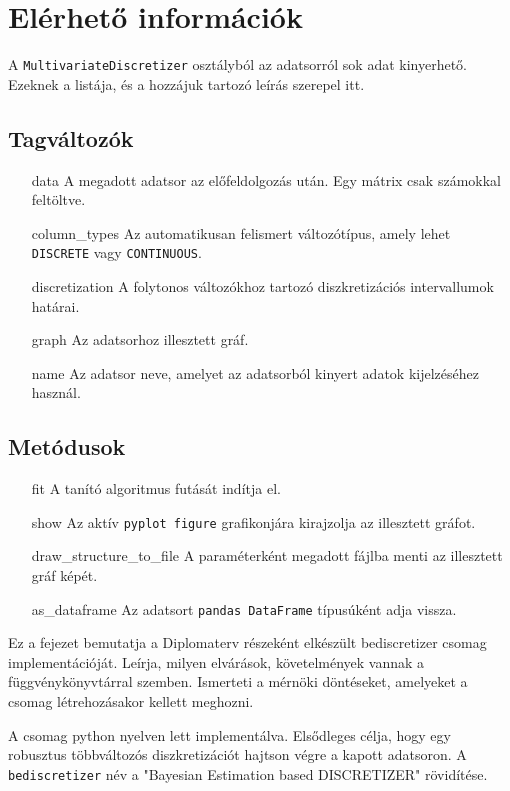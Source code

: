 \section{Elérhető információk}
A \verb|MultivariateDiscretizer| osztályból az adatsorról sok adat kinyerhető. Ezeknek a listája, és a hozzájuk tartozó leírás szerepel itt.

\subsection{Tagváltozók}
\begin{itemize}
    \item[data] A megadott adatsor az előfeldolgozás után. Egy mátrix csak számokkal feltöltve.
    \item[column\_types] Az automatikusan felismert változótípus, amely lehet \verb|DISCRETE| vagy \verb|CONTINUOUS|.
    \item[discretization] A folytonos változókhoz tartozó diszkretizációs intervallumok határai.
    \item[graph] Az adatsorhoz illesztett gráf.
    \item[name] Az adatsor neve, amelyet az adatsorból kinyert adatok kijelzéséhez használ.
\end{itemize}

\subsection{Metódusok}
\begin{itemize}
    \setlength{\itemindent}{5em}
    \item[fit] A tanító algoritmus futását indítja el.
    \item[show] Az aktív \verb|pyplot figure| grafikonjára kirajzolja az illesztett gráfot.
    \item[draw\_structure\_to\_file] A paraméterként megadott fájlba menti az illesztett gráf képét.
    \item[as\_dataframe] Az adatsort \verb|pandas DataFrame| típusúként adja vissza.
\end{itemize}
\fi

Ez a fejezet bemutatja a Diplomaterv részeként elkészült bediscretizer csomag implementációját. Leírja, milyen elvárások, követelmények vannak a függvénykönyvtárral szemben. Ismerteti a mérnöki döntéseket, amelyeket a csomag létrehozásakor kellett meghozni.

A csomag python nyelven lett implementálva. Elsődleges célja, hogy egy robusztus többváltozós diszkretizációt hajtson végre a kapott adatsoron. A \verb|bediscretizer| név a "Bayesian Estimation based DISCRETIZER" rövidítése.


